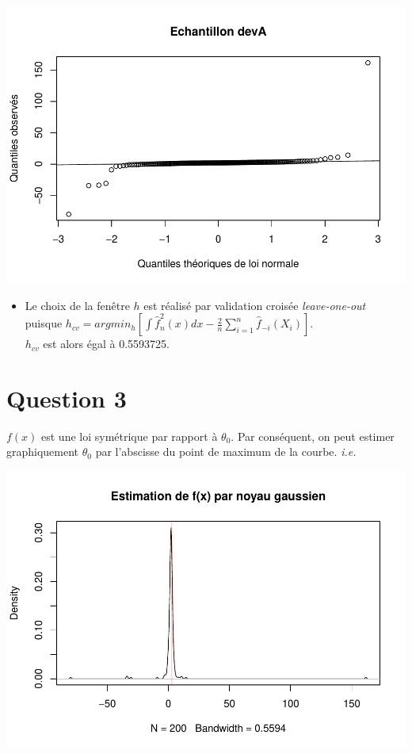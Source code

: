 \documentclass[
]{article}
\providecommand{\tightlist}{%
  \setlength{\itemsep}{0pt}\setlength{\parskip}{0pt}}
\begin{document}
\includegraphics{DM_files/figure-latex/unnamed-chunk-3-1.pdf}

\begin{itemize}
\tightlist
\item
  Le choix de la fenêtre \(h\) est réalisé par validation croisée
  \emph{leave-one-out} puisque
  \(h_{cv} = arg min_{h}[\int \hat{f}^2_{n}(x)dx - \frac{2}{n}\sum_{i=1}^{n}\hat{f}_{-i}(X_{i})]\).\\
  \(h_{cv}\) est alors égal à 0.5593725.
\end{itemize}

\hypertarget{question-3}{%
\section{Question 3}\label{question-3}}

\(f(x)\) est une loi symétrique par rapport à \(\theta_{0}\). Par
conséquent, on peut estimer graphiquement \(\theta_{0}\) par l'abscisse
du point de maximum de la courbe. \emph{i.e.}

\includegraphics{DM_files/figure-latex/unnamed-chunk-4-1.pdf}
\end{document}
